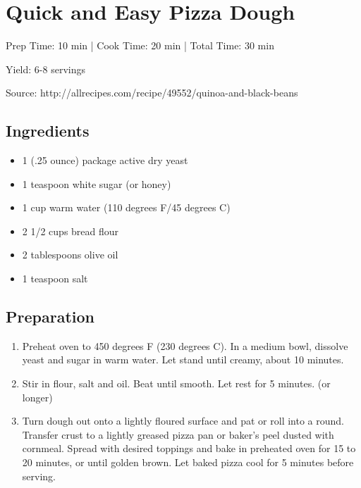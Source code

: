 \section{Quick and Easy Pizza Dough}

\begin{center}
Prep Time: 10 min | 
Cook Time: 20 min | 
Total Time: 30 min

\noindent Yield: 6-8 servings

\vspace{1em}

Source: http://allrecipes.com/recipe/49552/quinoa-and-black-beans
\end{center}

\subsection{Ingredients}
\begin{multicols}{2}
\begin{itemize}
    \item 1 (.25 ounce) package active dry yeast
    \item 1 teaspoon white sugar (or honey)
    \item 1 cup warm water (110 degrees F/45 degrees C)
    \item 2 1/2 cups bread flour
    \item 2 tablespoons olive oil
    \item 1 teaspoon salt
\end{itemize}
\end{multicols}

\subsection{Preparation}
\begin{enumerate}
    \item Preheat oven to 450 degrees F (230 degrees C). In a medium bowl, dissolve yeast and sugar in warm water. Let stand until creamy, about 10 minutes.
    \item Stir in flour, salt and oil. Beat until smooth. Let rest for 5 minutes. (or longer)
    \item Turn dough out onto a lightly floured surface and pat or roll into a round. Transfer crust to a lightly greased pizza pan or baker's peel dusted with cornmeal. Spread with desired toppings and bake in preheated oven for 15 to 20 minutes, or until golden brown. Let baked pizza cool for 5 minutes before serving.
\end{enumerate}

